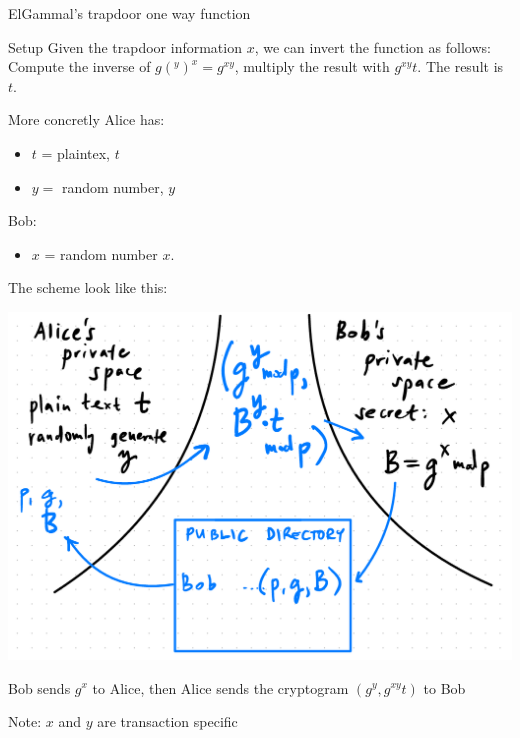 \begin{parag}{ElGammal's trapdoor one way function}
\begin{subparag}{Setup}
        Given the trapdoor information $x$, we can invert the function as follows:
        Compute the inverse of $g(^y)^x = g^{xy}$, multiply the result with $g^{xy}t$. The result is $t$.
    \end{subparag}
\begin{subparag}{More concretly}
    Alice has:
    \begin{itemize}
        \item $t$ = plaintex, $t$
        \item $y = $ random number, $y$
    \end{itemize}
    Bob:
    \begin{itemize}
        \item $x$ = random number $x$.
    \end{itemize}
    The scheme look like this:
    \begin{center}
        \includegraphics[scale=0.5]{42025-03-19.png}
    \end{center}
    Bob sends $g^x$ to Alice, then Alice sends the cryptogram $(g^y, g^{xy}t)$ to Bob
    \begin{framedremark}
        Note: $x$ and $y$ are transaction specific
    \end{framedremark}
    
    
    
    
\end{subparag}
\end{parag}

